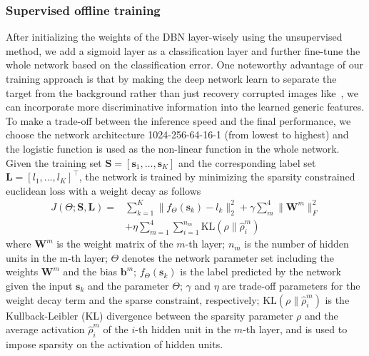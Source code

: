 \documentclass[preprint,12pt,review]{elsarticle}
\begin{document}
\subsubsection{Supervised offline training}
After initializing the weights of the DBN layer-wisely using the unsupervised method, we add a sigmoid layer as a classification layer and further fine-tune the whole network based on the classification error.
%
One noteworthy advantage of our training approach is that by making the deep network learn to separate the target from the background rather than just recovery corrupted images like~\cite{wang2013learning}, we can incorporate more discriminative information into the learned generic features.
%
To make a trade-off between the inference speed and the final performance, we choose the network architecture 1024-256-64-16-1 (from lowest to highest) and the logistic function is used as the non-linear function in the whole network.
%
Given the training set $\mathbf{S}=[\mathbf{s}_1,\ldots,\mathbf{s}_K]$ and the corresponding label set $\mathbf{L}=[l_1,\ldots,l_K]^{\top}$, the network is trained by minimizing the sparsity constrained euclidean loss with a weight decay as follows
\begin{equation}\label{eq:loss}
\begin{split}
  J(\Theta;\mathbf{S},\mathbf{L})=& \sum\limits_{k=1}^{K}\|f_{\Theta}(\mathbf{s}_k)-l_k\|_2^2+\gamma\sum\limits_{m}^{4}\|\mathbf{W}^m\|_F^2
  \\&+\eta\sum_{m=1}^{4}\sum_{i=1}^{n_m} \mathrm{KL}(\rho\|\hat{\rho}^m_i)
  \end{split}
\end{equation}
%
where $\mathbf{W}^m$ is the weight matrix of the $m$-th layer; ${n_m}$ is the number of hidden units in the m-th layer;
$\Theta$ denotes the network parameter set including the weights $\mathbf{W}^m$ and the bias $\mathbf{b}^m$;
$f_{\Theta}(\mathbf{s}_k)$ is the label predicted by the network given the input $\mathbf{s}_k$ and the parameter $\Theta$;
$\gamma$ and $\eta$ are trade-off parameters for the weight decay term and the sparse constraint, respectively;
$\mathrm{KL}(\rho\|\hat{\rho}^m_i)$ is the Kullback-Leibler (KL) divergence between the sparsity parameter $\rho$ and the average activation $\hat{\rho}^m_i$ of the $i$-th hidden unit in the $m$-th layer, and is used to impose sparsity on the activation of hidden units.
\end{document}
